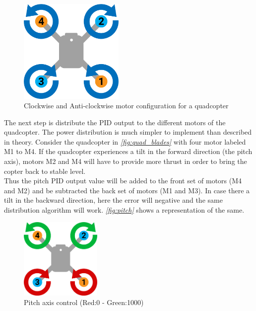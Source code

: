 \documentclass[a4paper,12pt,oneside]{book}
\begin{document}
\begin{figure}[!htb]
\centering
\includegraphics[width=0.45\textwidth]{images/quad_basic}
\caption{Clockwise and Anti-clockwise motor configuration for a quadcopter}
\label{fig:quad_blades}
\end{figure}

The next step is distribute the PID output to the different motors of the quadcopter. The power distribution is much simpler to implement than described in theory. Consider the quadcopter in \textit{\autoref{fig:quad_blades}} with four motor labeled M1 to M4. If the quadcopter experiences a tilt in the forward direction (the pitch axis), motors M2 and M4 will have to provide more thrust in order to bring the copter back to stable level.\\

Thus the pitch PID output value will be added to the front set of motors (M4 and M2) and be subtracted the back set of motors (M1 and M3). In case there a tilt in the backward direction, here the error will negative and the same distribution algorithm will work. \textit{\autoref{fig:pitch}} shows a representation of the same.\\

\begin{figure}[!htb]
\centering
\includegraphics[width=0.35\textwidth]{images/pitch}
\caption{Pitch axis control (Red:0 - Green:1000)}
\label{fig:pitch}
\end{figure}
\end{document}
